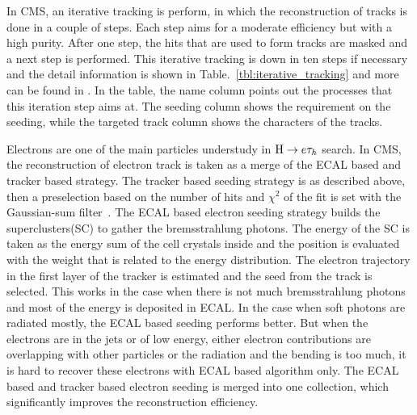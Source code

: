 In CMS, an iterative tracking is perform, in which the reconstruction of tracks is done in a couple of steps. Each step aims for a moderate efficiency but with a high purity. After one step, the hits that are used to form tracks are masked and a next step is performed. This iterative tracking is down in ten steps if necessary and the detail information is shown in Table.~\ref{tbl:iterative_tracking} and more can be found in \cite{CMS-PRF-14-001}. In the table, the name column points out the processes that this iteration step aims at. The seeding column shows the requirement on the seeding, while the targeted track column shows the characters of the tracks.

Electrons are one of the main particles understudy in $\mathrm{H} \to e \tau_{h}$ search. In CMS, the reconstruction of electron track is taken as a merge of the ECAL based and tracker based strategy. The tracker based seeding strategy is as described above, then a preselection based on the number of hits and $\chi^{2}$ of the fit is set with the Gaussian-sum filter~\cite{Algo:GSF}. The ECAL based electron seeding strategy builds the superclusters(SC) to gather the bremsstrahlung photons. The energy of the SC is taken as the energy sum of the cell crystals inside and the position is evaluated with the weight that is related to the energy distribution. The electron trajectory in the first layer of the tracker is estimated and the seed from the track is selected. This works in the case when there is not much bremsstrahlung photons and most of the energy is deposited in ECAL. In the case when soft photons are radiated mostly, the ECAL based seeding performs better. But when the electrons are in the jets or of low energy, either electron contributions are overlapping with other particles or the radiation and the bending is too much, it is hard to recover these electrons with ECAL based algorithm only. The ECAL based and tracker based electron seeding is merged into one collection, which significantly improves the reconstruction efficiency.




